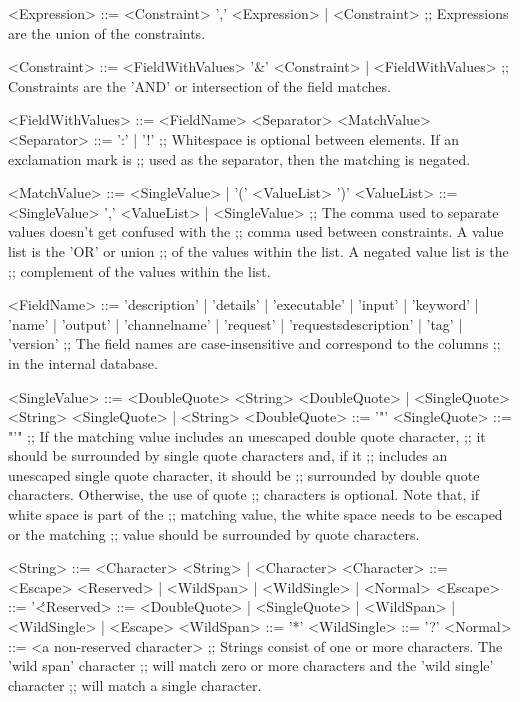 \begin{listing}[5]{1}
<Expression> ::= <Constraint> ',' <Expression> | <Constraint>
;; Expressions are the union of the constraints.

<Constraint> ::= <FieldWithValues> '&' <Constraint> | <FieldWithValues>
;; Constraints are the 'AND' or intersection of the field matches.

<FieldWithValues> ::= <FieldName> <Separator> <MatchValue>
<Separator> ::= ':' | '!'
;; Whitespace is optional between elements. If an exclamation mark is
;; used as the separator, then the matching is negated.

<MatchValue> ::= <SingleValue> | '(' <ValueList> ')'
<ValueList> ::= <SingleValue> ',' <ValueList> | <SingleValue>
;; The comma used to separate values doesn't get confused with the
;; comma used between constraints. A value list is the 'OR' or union
;; of the values within the list. A negated value list is the
;; complement of the values within the list.

<FieldName> ::= 'description' | 'details' | 'executable' | 'input' |
                'keyword' | 'name' | 'output' | 'channelname' |
                'request' | 'requestsdescription' | 'tag' | 'version'
;; The field names are case-insensitive and correspond to the columns
;; in the internal database.

<SingleValue> ::= <DoubleQuote> <String> <DoubleQuote> |
                  <SingleQuote> <String> <SingleQuote> | <String>
<DoubleQuote> ::= '"'
<SingleQuote> ::= "'"
;; If the matching value includes an unescaped double quote character,
;; it should be surrounded by single quote characters and, if it
;; includes an unescaped single quote character, it should be
;; surrounded by double quote characters. Otherwise, the use of quote
;; characters is optional. Note that, if white space is part of the
;; matching value, the white space needs to be escaped or the matching
;; value should be surrounded by quote characters.

<String> ::= <Character> <String> | <Character>
<Character> ::= <Escape> <Reserved> | <WildSpan> | <WildSingle> |
                <Normal>
<Escape> ::= '\'
<Reserved> ::= <DoubleQuote> | <SingleQuote> | <WildSpan> |
               <WildSingle> | <Escape>
<WildSpan> ::= '*'
<WildSingle> ::= '?'
<Normal> ::= <a non-reserved character>
;; Strings consist of one or more characters. The 'wild span' character
;; will match zero or more characters and the 'wild single' character
;; will match a single character.
\end{listing}
\outputEnd{}
\appendixEnd{}

